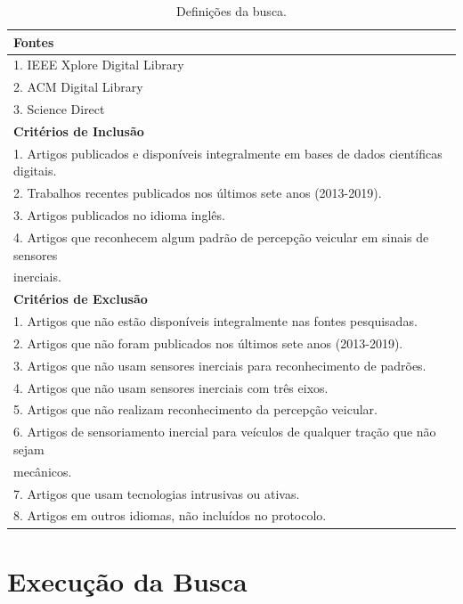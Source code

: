 \begin{table}[h!]
    \caption{Definições da busca.}
    \label{tabela:definicao_pesquisa}
    \begin{tabular}{l}
        \toprule
        \textbf{Fontes} \\
        \toprule
        1. IEEE Xplore Digital Library \\
        2. ACM Digital Library \\
        3. Science Direct \\
        \toprule
        \textbf{Critérios de Inclusão}\\
        \toprule
        1. Artigos publicados e disponíveis integralmente em bases de dados científicas digitais.\\
        2. Trabalhos recentes publicados nos últimos sete anos (2013-2019).\\ 
        3. Artigos publicados no idioma inglês.\\
        4. Artigos que reconhecem algum padrão de percepção veicular em sinais de sensores \\ inerciais.\\
        \toprule
        \textbf{Critérios de Exclusão}\\
        \toprule
        1. Artigos que não estão disponíveis integralmente nas fontes pesquisadas.\\
        2. Artigos que não foram publicados nos últimos sete anos (2013-2019).\\
        3. Artigos que não usam sensores inerciais para reconhecimento de padrões.\\
        4. Artigos que não usam sensores inerciais com três eixos.\\
        5. Artigos que não realizam reconhecimento da percepção veicular. \\
        6. Artigos de sensoriamento inercial para veículos de qualquer tração que não sejam \\ mecânicos. \\
        7. Artigos que usam tecnologias intrusivas ou ativas.\\
        8. Artigos em outros idiomas, não incluídos no protocolo.\\
        \bottomrule
    \end{tabular}
\end{table}

\section{Execução da Busca}

